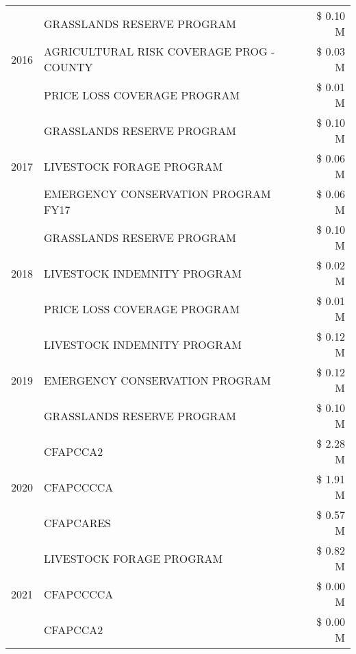 \begin{tabular}{llr}
\cline{1-3}
\multirow[t]{3}{*}{2016} & GRASSLANDS RESERVE PROGRAM & \$ 0.10 M \\
 & AGRICULTURAL RISK COVERAGE PROG - COUNTY & \$ 0.03 M \\
 & PRICE LOSS COVERAGE PROGRAM & \$ 0.01 M \\
\cline{1-3}
\multirow[t]{3}{*}{2017} & GRASSLANDS RESERVE PROGRAM & \$ 0.10 M \\
 & LIVESTOCK FORAGE PROGRAM & \$ 0.06 M \\
 & EMERGENCY CONSERVATION PROGRAM FY17 & \$ 0.06 M \\
\cline{1-3}
\multirow[t]{3}{*}{2018} & GRASSLANDS RESERVE PROGRAM & \$ 0.10 M \\
 & LIVESTOCK INDEMNITY PROGRAM & \$ 0.02 M \\
 & PRICE LOSS COVERAGE PROGRAM & \$ 0.01 M \\
\cline{1-3}
\multirow[t]{3}{*}{2019} & LIVESTOCK INDEMNITY PROGRAM & \$ 0.12 M \\
 & EMERGENCY CONSERVATION PROGRAM & \$ 0.12 M \\
 & GRASSLANDS RESERVE PROGRAM & \$ 0.10 M \\
\cline{1-3}
\multirow[t]{3}{*}{2020} & CFAPCCA2 & \$ 2.28 M \\
 & CFAPCCCCA & \$ 1.91 M \\
 & CFAPCARES & \$ 0.57 M \\
\cline{1-3}
\multirow[t]{3}{*}{2021} & LIVESTOCK FORAGE PROGRAM & \$ 0.82 M \\
 & CFAPCCCCA & \$ 0.00 M \\
 & CFAPCCA2 & \$ 0.00 M \\
\cline{1-3}
\bottomrule
\end{tabular}
